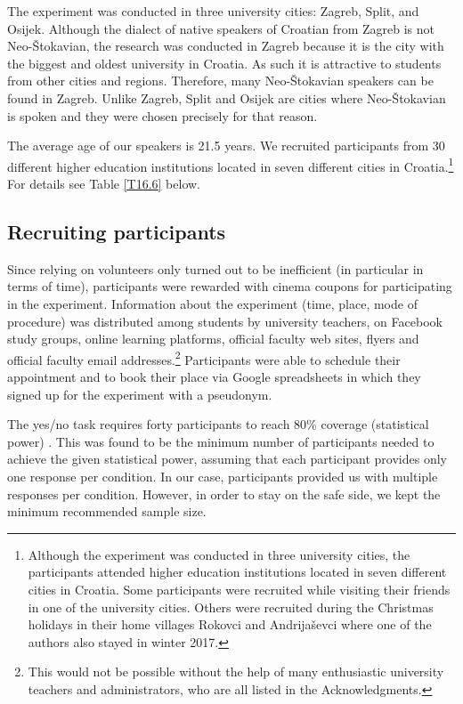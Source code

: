 The experiment was conducted in three university cities: Zagreb, Split, and Osijek. Although the dialect of native speakers of Croatian from Zagreb is not Neo-Štokavian, the research was conducted in Zagreb because it is the city with the biggest and oldest university in Croatia. As such it is attractive to students from other cities and regions. Therefore, many Neo-Štokavian speakers can be found in Zagreb. Unlike Zagreb, Split and Osijek are cities where Neo-Štokavian is spoken and they were chosen precisely for that reason.

The average age of our speakers is 21.5 years. We recruited participants from 30 different higher education institutions located in seven different cities in Croatia.\footnote{Although the experiment was conducted in three university cities, the participants attended higher education institutions located in seven different cities in Croatia. Some participants were recruited while visiting their friends in one of the university cities. Others were recruited during the Christmas holidays in their home villages Rokovci and Andrijaševci where one of the authors also stayed in winter 2017.} For details see Table \ref{T16.6} below.

\subsection{Recruiting participants}
\label{Recruiting participants}

Since relying on volunteers only turned out to be inefficient (in particular in terms of time), participants were rewarded with cinema coupons for participating in the experiment. Information about the experiment (time, place, mode of procedure) was distributed among students by university teachers, on Facebook study groups, online learning platforms, official faculty web sites, flyers and official faculty email addresses.\footnote{This would not be possible without the help of many enthusiastic university teachers and administrators, who are all listed in the Acknowledgments.} Participants were able to schedule their appointment and to book their place via Google spreadsheets in which they signed up for the experiment with a pseudonym. 

The yes/no task requires forty participants to reach 80\% coverage (statistical power) \citep[][40]{SchutzeSprouse13}. This was found to be the minimum number of participants needed to achieve the given statistical power, assuming that each participant provides only one response per condition. In our case, participants provided us with multiple responses per condition. However, in order to stay on the safe side, we kept the minimum recommended sample size. 

